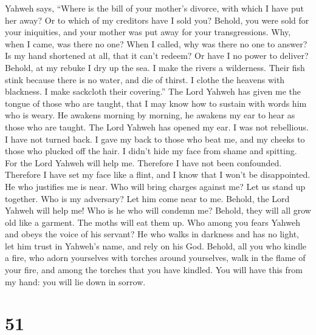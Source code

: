  Yahweh says, ``Where is the bill of your mother's divorce,
with which I have put her away? Or to which of my creditors have I sold
you? Behold, you were sold for your iniquities, and your mother was put
away for your transgressions.  Why, when I came, was there
no one? When I called, why was there no one to answer? Is my hand
shortened at all, that it can't redeem? Or have I no power to deliver?
Behold, at my rebuke I dry up the sea. I make the rivers a wilderness.
Their fish stink because there is no water, and die of thirst.
 I clothe the heavens with blackness. I make sackcloth their
covering.''  The Lord Yahweh has given me the tongue of
those who are taught, that I may know how to sustain with words him who
is weary. He awakens morning by morning, he awakens my ear to hear as
those who are taught.  The Lord Yahweh has opened my ear. I
was not rebellious. I have not turned back.  I gave my back
to those who beat me, and my cheeks to those who plucked off the hair. I
didn't hide my face from shame and spitting.  For the Lord
Yahweh will help me. Therefore I have not been confounded. Therefore I
have set my face like a flint, and I know that I won't be disappointed.
 He who justifies me is near. Who will bring charges against
me? Let us stand up together. Who is my adversary? Let him come near to
me.  Behold, the Lord Yahweh will help me! Who is he who
will condemn me? Behold, they will all grow old like a garment. The
moths will eat them up.  Who among you fears Yahweh and
obeys the voice of his servant? He who walks in darkness and has no
light, let him trust in Yahweh's name, and rely on his God.
 Behold, all you who kindle a fire, who adorn yourselves
with torches around yourselves, walk in the flame of your fire, and
among the torches that you have kindled. You will have this from my
hand: you will lie down in sorrow.

\hypertarget{section-47}{%
\section{51}\label{section-47}}

